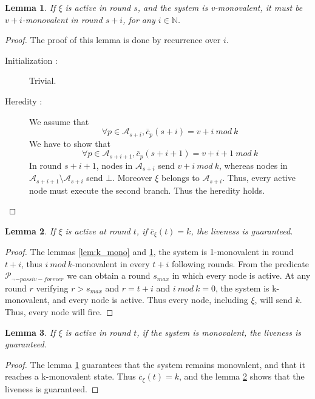 \documentclass{article}
\newtheorem{lemma}{Lemma}[section]
\begin{document}
\begin{lemma}\label{lem:mono_mono}
	If $\xi$ is active in round $s$, and the system is v-monovalent, it must be $v+i$-monovalent in round $s+i$,
	for any $i \in \mathds{N}$.
\end{lemma}
\begin{proof}
	The proof of this lemma is done by recurrence over $i$.
	\begin{description}
		\item[Initialization :] Trivial.
		\item[Heredity :] We assume that
			$$\forall p \in \mathcal{A}_{s+i}, \overline{c}_p(s+i) = v+i~mod~k$$
			We have to show that 
			$$\forall p \in \mathcal{A}_{s+i+1}, \overline{c}_p(s+i+1) = v+i+1~mod~k$$
			In round $s+i+1$, nodes in $\mathcal{A}_{s+i}$ send $v+i~mod~k$, whereas nodes 
			in $\mathcal{A}_{s+i+1} \setminus \mathcal{A}_{s+i}$ send $\bot$.
			Moreover $\xi$ belongs to $\mathcal{A}_{s+i}$.
			Thus, every active node must execute the second branch.
			Thus the heredity holds.
	\end{description}
\end{proof}

\begin{lemma}\label{lem:k_liv}
	If $\xi$ is active at round $t$, if $\overline{c}_\xi(t) = k$, the liveness is guaranteed.
\end{lemma}
\begin{proof}
	The lemmas \ref{lem:k_mono} and \ref{lem:mono_mono}, the system is 1-monovalent in round $t+i$,
	thus $i~mod~k$-monovalent in every $t+i$ following rounds.
	From the predicate $\mathcal{P}_{\neg-passiv-forever}$ we can obtain a round $s_{max}$ in which every node is active.
	At any round $r$ verifying $r > s_{max}$ and $r = t + i$ and $i~mod~k = 0$, the system is k-monovalent,
	and every node is active. Thus every node, including $\xi$, will send $k$.
	Thus, every node will fire.
\end{proof}

\begin{lemma}\label{lem:mono_liv}
	If $\xi$ is active in round $t$, if the system is monovalent, the liveness is guaranteed.
\end{lemma}
\begin{proof}
	The lemma \ref{lem:mono_mono} guarantees that the system remains monovalent, and that it reaches a
	k-monovalent state.
	Thus $\overline{c}_\xi(t) = k$, and the lemma \ref{lem:k_liv} shows that the liveness is guaranteed.
\end{proof}
\end{document}
